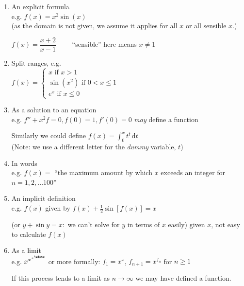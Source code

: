 \begin{enumerate}
\item An explicit formula\\
 e.g. $f(x) = x^2\sin(x)$\\
(as the domain is not given, we assume it applies for all $x$ or all sensible $x$.)

$f(x) = \dfrac{x+2}{x-1} \qquad$ ``sensible'' here means $x \neq 1$\\

\item Split ranges, e.g.\\

$f(x) = \begin{cases}
 x \text{ if } x > 1\\
 \sin(x^2) \text{ if } 0 < x \leq 1\\
 e^x \text{ if } x \leq 0
 \end{cases}$\\
 
\pagebreak
 
\item As a solution to an equation\\
e.g. $f'' + x^2f = 0, f(0) = 1, f'(0) = 0$ \textit{may} define a function
 
Similarly we could define $f(x) = \displaystyle{\int_0^x t^t \, \mathrm{d}t}$\\(Note: we use a different letter for the \textit{dummy} variable, $t$)\\

\item In words\\
 e.g. $f(x) =$ ``the maximum amount by which $x$ exceeds an integer for $ n = 1,2,...100$''\\

\item An implicit definition\\
 e.g. $f(x)$ given by $f(x) + \frac{1}{2}\sin[f(x)] = x$

(or $y + \sin y = x :$ we can't solve for $y$ in terms of $x$ easily) given $x$, not easy to calculate $f(x)$\\

\item As a limit \vspace{5pt}\\ 
 e.g. $x^{x^{x^{ \udots }}}$ or more formally: $f_1 = x^x$, $f_{n+1} = x^{f_n}$ for $n \geq 1$

If this process tends to a limit as $n \to \infty$ we may have defined a function.
\end{enumerate}

